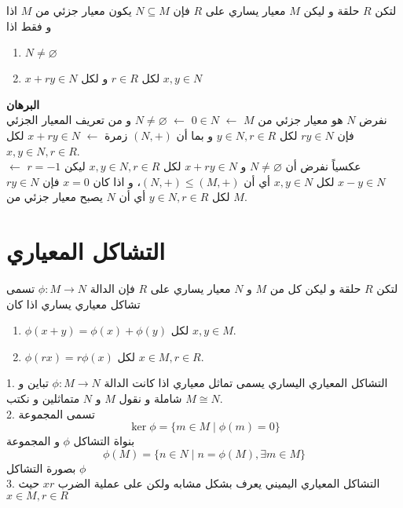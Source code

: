 \begin{theorem}
	لتكن $R$ حلقة و ليكن $M$ معيار يساري على $R$ فإن $N\subseteq M$ يكون معيار جزئي من $M$ اذا و فقط اذا
	\begin{enumerate}
		\item $N\neq \varnothing$
		\item $x+ry\in N$ لكل $r\in R$ و لكل $x,y\in N$
	\end{enumerate}
\end{theorem}
\noindent
\textbf{البرهان}\\
\noindent
نفرض $N$ هو معيار جزئي من $M$ $\leftarrow$ $0\in N$ $\leftarrow$ $N\neq \varnothing$ و من تعريف المعيار الجزئي فإن $ry\in N$ لكل $y\in N, r\in R$ و بما أن $(N,+)$ زمرة $\leftarrow$ $x+ry\in N$ لكل $x,y\in N, r\in R$.\\
عكسياً نفرض أن $N\neq \varnothing$ و $x+ry\in N$ لكل $x,y\in N, r\in R$ ليكن $r=-1$ $\leftarrow$ $x-y\in N$ لكل $x,y\in N$ أي أن $(N,+)\leq (M,+)$، و اذا كان $x=0$ فإن $ry\in N$ لكل $y\in N, r\in R$ أي أن $N$ يصبح معيار جزئي من $M$. \qedsymbol

\section{التشاكل المعياري}

\begin{definition}
	لتكن $R$ حلقة و ليكن كل من $M$ و $N$ معيار يساري على $R$ فإن الدالة $\phi:M\to N$ تسمى تشاكل معياري يساري اذا كان 
	\begin{enumerate}
		\item $\phi(x+y) = \phi(x) + \phi(y)$ لكل $x,y\in M$.
		\item $\phi(rx) = r\phi(x)$ لكل $x\in M, r\in R$.  
	\end{enumerate}
\end{definition}

\begin{note}
1.	التشاكل المعياري اليساري يسمى تماثل معياري  اذا كانت الدالة $\phi:M\to N$ تباين و شاملة و نقول $M$ و $N$ متماثلين  و نكتب $M\cong N$.\\
2. تسمى المجموعة 
\[
\ker\phi = \{m\in M\mid \phi(m) = 0\}
\]
بنواة التشاكل $\phi$ و المجموعة 
\[
\phi(M) = \{ n\in N \mid n = \phi(M), \exists m\in M\}
\]
بصورة التشاكل $\phi$\\
3. التشاكل المعياري اليميني يعرف بشكل مشابه ولكن على عملية الضرب $xr$ حيث $x\in M, r\in R$
\end{note}

